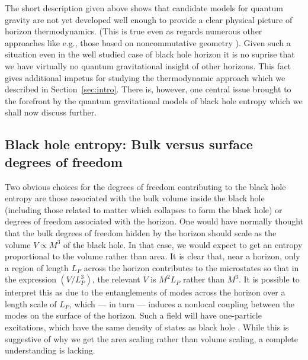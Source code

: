 \documentclass[12pt]{iopart}
\begin{document}
The short description given above shows that candidate models for quantum gravity are not yet developed well enough to provide a clear physical picture of horizon thermodynamics. (This is true even as regards numerous other approaches like e.g., those based on noncommutative geometry \cite{nicolini}). Given such a  situation even in the well studied  case 
of black hole horizon it is no suprise that we have virtually no quantum gravitational insight of other horizons. This fact gives additional impetus for studying the thermodynamic approach which we described in Section~\ref{sec:intro}.
There is, however, one central issue brought to the forefront by the quantum gravitational models of black hole entropy which we shall now discuss further.


\subsection{Black hole entropy: Bulk versus surface degrees of freedom}

Two obvious choices for the degrees of freedom contributing to the black hole entropy are
 those  associated with the
 bulk volume inside the black hole (including those related to 
 matter which collapses to form the black hole) or
 degrees of freedom associated with the horizon. 
One would have normally thought that the bulk degrees of freedom hidden by the horizon
should scale as the volume $V\propto M^3$ of the black hole. 
In that case, we would expect to
 get an entropy proportional to the volume rather than area. It is clear that, near a horizon, only a region of length $L_P$ across the horizon contributes to the microstates so that in 
the expression $(V/L_P^3)$, the relevant $V$ is $M^2 L_P$ rather than $M^3$. It is possible to interpret this as due to the entanglements of modes across the horizon over a length scale of $L_P$, which --- in turn --- induces a nonlocal coupling between the modes on the surface of the horizon. Such a field will have one-particle excitations, which have the same density of states as black hole \cite{Padmanabhan:1998jp,Padmanabhan:1998vr}. While this is suggestive of why we get the area scaling rather than volume scaling, a complete understanding is lacking. 
\end{document}
